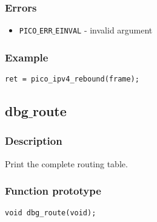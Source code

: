 \subsubsection*{Errors}
\begin{itemize}[noitemsep]
\item \texttt{PICO$\_$ERR$\_$EINVAL} - invalid argument
\end{itemize}

\subsubsection*{Example}
\begin{verbatim}
ret = pico_ipv4_rebound(frame);
\end{verbatim}



\subsection{dbg$\_$route}

\subsubsection*{Description}
Print the complete routing table. 

\subsubsection*{Function prototype}
\begin{verbatim}
void dbg_route(void);
\end{verbatim}


